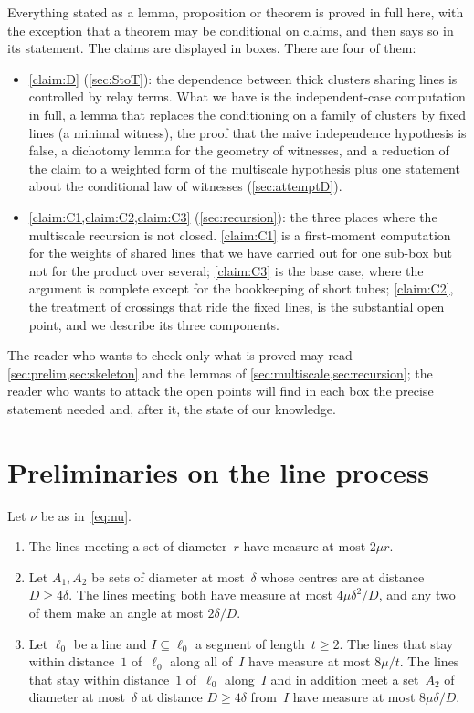 \documentclass[11pt,letterpaper]{article}
\begin{document}
Everything stated as a lemma, proposition or theorem is proved in full here, with the exception that a theorem may be conditional on claims, and then says so in its statement. The claims are displayed in boxes. There are four of them:
\begin{itemize}
  \item \cref{claim:D} (\cref{sec:StoT}): the dependence between thick clusters sharing lines is controlled by relay terms. What we have is the independent-case computation in full, a lemma that replaces the conditioning on a family of clusters by fixed lines (a minimal witness), the proof that the naive independence hypothesis is false, a dichotomy lemma for the geometry of witnesses, and a reduction of the claim to a weighted form of the multiscale hypothesis plus one statement about the conditional law of witnesses (\cref{sec:attemptD}).
  \item \cref{claim:C1,claim:C2,claim:C3} (\cref{sec:recursion}): the three places where the multiscale recursion is not closed. \cref{claim:C1} is a first-moment computation for the weights of shared lines that we have carried out for one sub-box but not for the product over several; \cref{claim:C3} is the base case, where the argument is complete except for the bookkeeping of short tubes; \cref{claim:C2}, the treatment of crossings that ride the fixed lines, is the substantial open point, and we describe its three components.
\end{itemize}
The reader who wants to check only what is proved may read \cref{sec:prelim,sec:skeleton} and the lemmas of \cref{sec:multiscale,sec:recursion}; the reader who wants to attack the open points will find in each box the precise statement needed and, after it, the state of our knowledge.

\section{Preliminaries on the line process}
\label{sec:prelim}

\begin{lemma}
\label{lem:measures}
Let $\nu$ be as in~\eqref{eq:nu}.
\begin{enumerate}
  \item[\emph{(a)}] The lines meeting a set of diameter~$r$ have measure at most $2\mu r$.
  \item[\emph{(b)}] Let $A_1,A_2$ be sets of diameter at most~$\delta$ whose centres are at distance $D\ge4\delta$. The lines meeting both have measure at most $4\mu\delta^2/D$, and any two of them make an angle at most $2\delta/D$.
  \item[\emph{(c)}] Let $\ell_0$ be a line and $I\subseteq\ell_0$ a segment of length~$t\ge2$. The lines that stay within distance~$1$ of~$\ell_0$ along all of~$I$ have measure at most $8\mu/t$. The lines that stay within distance~$1$ of~$\ell_0$ along~$I$ and in addition meet a set~$A_2$ of diameter at most~$\delta$ at distance $D\ge4\delta$ from~$I$ have measure at most $8\mu\delta/D$.
\end{enumerate}
\end{lemma}
\end{document}
